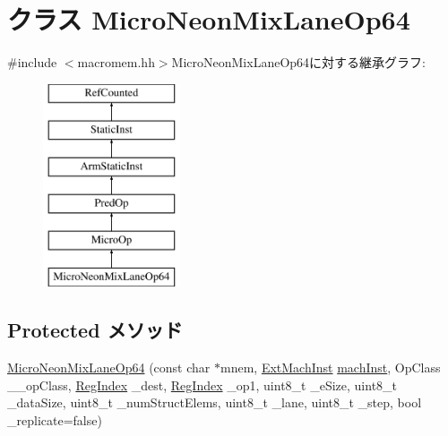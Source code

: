 \hypertarget{classArmISA_1_1MicroNeonMixLaneOp64}{
\section{クラス MicroNeonMixLaneOp64}
\label{classArmISA_1_1MicroNeonMixLaneOp64}
}


{\ttfamily \#include $<$macromem.hh$>$}MicroNeonMixLaneOp64に対する継承グラフ:\begin{figure}[H]
\begin{center}
\leavevmode
\includegraphics[height=6cm]{classArmISA_1_1MicroNeonMixLaneOp64}
\end{center}
\end{figure}
\subsection*{Protected メソッド}
\begin{DoxyCompactItemize}
\item 
\hyperlink{classArmISA_1_1MicroNeonMixLaneOp64_a9d9e8837f3b4b5a5c931fb6133f35b36}{MicroNeonMixLaneOp64} (const char $\ast$mnem, \hyperlink{classStaticInst_a5605d4fc727eae9e595325c90c0ec108}{ExtMachInst} \hyperlink{classStaticInst_a744598b194ca3d4201d9414ce4cc4af4}{machInst}, OpClass \_\-\_\-opClass, \hyperlink{classStaticInst_a36d25e03e43fa3bb4c5482cbefe5e0fb}{RegIndex} \_\-dest, \hyperlink{classStaticInst_a36d25e03e43fa3bb4c5482cbefe5e0fb}{RegIndex} \_\-op1, uint8\_\-t \_\-eSize, uint8\_\-t \_\-dataSize, uint8\_\-t \_\-numStructElems, uint8\_\-t \_\-lane, uint8\_\-t \_\-step, bool \_\-replicate=false)
\end{DoxyCompactItemize}
